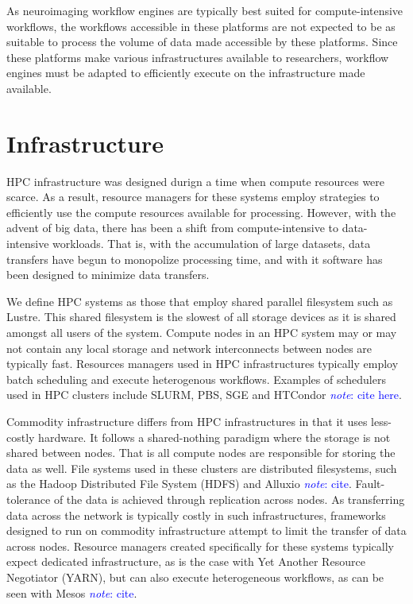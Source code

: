 \documentclass{report}
\newcommand{\note}[1]{\textcolor{blue}{\textit{note}: #1}}
\begin{document}
            As neuroimaging workflow engines are typically best suited for 
            compute-intensive workflows, the workflows accessible in these 
            platforms are not expected to be as suitable to process the 
            volume of data made accessible by these platforms. Since these 
            platforms make various infrastructures available to researchers, 
            workflow engines must be adapted to efficiently execute on the 
            infrastructure made available.
            
        \section{Infrastructure}\label{infrastructure}
            HPC infrastructure was designed durign a time when compute resources
            were scarce. As a result, resource managers for these systems employ
            strategies to efficiently use the compute resources available for 
            processing. However, with the advent of big data, there has been a 
            shift from compute-intensive to data-intensive workloads. That is, 
            with the accumulation of large datasets, data transfers have begun 
            to monopolize processing time, and with it software has been 
            designed to minimize data transfers.

            We define HPC systems as those that employ shared parallel 
            filesystem such as Lustre. This shared filesystem is the slowest of
            all storage devices as it is shared amongst all users of the system.
            Compute nodes in an HPC system may or may not contain any local 
            storage and network interconnects between nodes are typically fast.
            Resources managers used in HPC infrastructures typically employ 
            batch scheduling and execute heterogenous workflows. 
            Examples of schedulers used in HPC clusters 
            include SLURM, PBS, SGE and HTCondor \note{cite here}.

            Commodity infrastructure differs from HPC infrastructures in that
            it uses less-costly hardware. It follows a shared-nothing paradigm
            where the storage is not shared between nodes. That is all compute
            nodes are responsible for storing the data as well. File systems
            used in these clusters are distributed filesystems, such as the
            Hadoop Distributed File System (HDFS) and Alluxio \note{cite}.
            Fault-tolerance of the data is achieved through replication across
            nodes. As transferring data across the network is typically costly 
            in such infrastructures, frameworks designed to run on commodity 
            infrastructure attempt to limit the transfer of data across nodes. 
            Resource managers created specifically for these systems
            typically expect dedicated infrastructure, as is the case with 
            Yet Another Resource Negotiator (YARN), but can also execute 
            heterogeneous workflows, as can be seen with Mesos \note{cite}.
\end{document}
